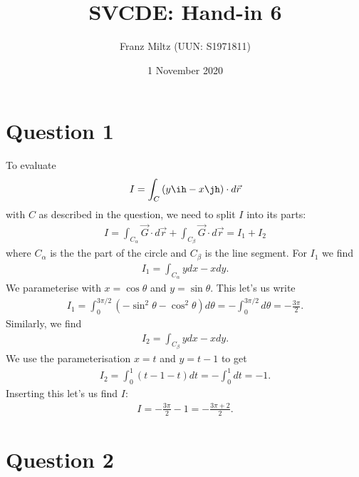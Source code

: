 \documentclass{article}
\begin{document}
\title{SVCDE: Hand-in 6}
\author{Franz Miltz (UUN: S1971811)}
\date{1 November 2020}
\maketitle


\section*{Question 1}


To evaluate
\begin{align*}
  I=\int_C \left(y\ih - x\jh\right)\cdot d\vec r
\end{align*}
with $C$ as described in the question, we need to split $I$ into its
parts:
\begin{align*}
  I = \int_{C_\alpha} \vec G \cdot d\vec r + \int_{C_\beta} \vec G \cdot d\vec r = I_1 + I_2
\end{align*}
where $C_\alpha$ is the the part of the circle and $C_\beta$ is the line segment.
For $I_1$ we find
\begin{align*}
  I_1 = \int_{C_\alpha} ydx-xdy.
\end{align*}
We parameterise with $x=\cos\theta$ and $y=\sin\theta$.
This let's us write
\begin{align*}
  I_1 = \int_0^{3\pi/2} \left(-\sin^2\theta - \cos^2\theta\right) d\theta
  =-\int_0^{3\pi/2}d\theta=-\frac{3\pi}{2}.
\end{align*}
Similarly, we find
\begin{align*}
  I_2 = \int_{C_\beta} ydx-xdy.
\end{align*}
We use the parameterisation $x=t$ and $y=t-1$ to get
\begin{align*}
  I_2 = \int_0^1 (t-1-t)dt=-\int_0^1 dt = -1.
\end{align*}
Inserting this let's us find $I$:
\begin{align*}
  I = -\frac{3\pi}{2}-1 = -\frac{3\pi + 2}{2}.
\end{align*}


\section*{Question 2}
\end{document}
